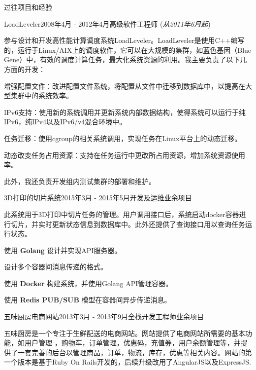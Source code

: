 \documentclass{resume} %
\newcommand{\kaiti}{\CJKfamily{kaiti}}
\begin{document}
\begin{rSection}{\kaiti 过往项目和经验}
\begin{rSubsection}{LoadLeveler}{2008年4月 - 2012年4月}{高级软件工程师 (\textit{从2011年6月起})}{}

参与设计和开发高性能计算调度系统LoadLeveler。LoadLeveler是使用C++编写的，运行于Linux/AIX上的调度软件，它可以在大规模的集群，如蓝色基因（Blue Gene）中，有效的调度计算任务，最大化系统资源的利用。我主要负责了以下几方面的开发：

\begin{rSubsectionList}
\item 增强配置文件：改进配置文件系统，将配置从文件中迁移到数据库中，以提高在大型集群中的系统效率。
\item IPv6支持：使用新的系统调用并更新系统内部数据结构，使得系统可以运行于纯IPv6，纯IPv4以及IPv6/v4混合环境中。
\item 任务迁移：使用cgroup的相关系统调用，实现任务在Linux平台上的动态迁移。
\item 动态改变任务占用资源：支持在任务运行中更改所占用资源，增加系统资源使用率。
\end{rSubsectionList}\vspace{-1.5em}

此外，我还负责开发组内测试集群的部署和维护。
\end{rSubsection}
\vspace{1.8em}


\begin{rSubsection}{3D打印的切片系统}{2015年3月 - 2015年5月}{开发及运维}{业余项目}

此系统用于3D打印中切片任务的管理。用户调用接口后，系统启动docker容器进行切片，并实时更新状态信息到数据库中。此外还提供了查询接口用以查询任务运行状态。

\begin{rSubsectionList}
\item 使用 \textbf{Golang} 设计并实现API服务器。
\item 设计多个容器间消息传递的格式。
\item 使用 \textbf{Docker} 构建系统，并使用Golang API管理容器。
\item 使用 \textbf{Redis PUB/SUB} 模型在容器间异步传递消息。
\end{rSubsectionList}
\end{rSubsection}



\begin{rSubsection}{五味厨房电商网站}{2013年3月 - 2013年9月}{全栈开发工程师}{业余项目}

五味厨房是一个专注于生鲜配送的电商网站。网站提供了电商网站所需要的基本功能，如用户管理 ，购物车，订单管理，优惠码，充值券，用户余额管理等，并提供了一套完善的后台以管理商品，订单，物流，库存，优惠等相关内容。网站的第一个版本是基于Ruby On Rails开发的，后续升级改用了AngularJS以及ExpressJS.


\end{rSubsection}
\end{rSection}
\end{document}
